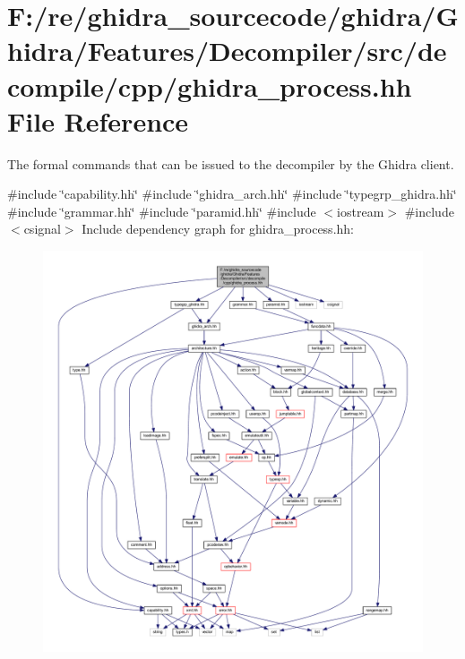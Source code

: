 \hypertarget{ghidra__process_8hh}{}\section{F\+:/re/ghidra\+\_\+sourcecode/ghidra/\+Ghidra/\+Features/\+Decompiler/src/decompile/cpp/ghidra\+\_\+process.hh File Reference}
\label{ghidra__process_8hh}


The formal commands that can be issued to the decompiler by the Ghidra client.  


{\ttfamily \#include \char`\"{}capability.\+hh\char`\"{}}\newline
{\ttfamily \#include \char`\"{}ghidra\+\_\+arch.\+hh\char`\"{}}\newline
{\ttfamily \#include \char`\"{}typegrp\+\_\+ghidra.\+hh\char`\"{}}\newline
{\ttfamily \#include \char`\"{}grammar.\+hh\char`\"{}}\newline
{\ttfamily \#include \char`\"{}paramid.\+hh\char`\"{}}\newline
{\ttfamily \#include $<$iostream$>$}\newline
{\ttfamily \#include $<$csignal$>$}\newline
Include dependency graph for ghidra\+\_\+process.\+hh\+:
\nopagebreak
\begin{figure}[H]
\begin{center}
\leavevmode
\includegraphics[width=350pt]{ghidra__process_8hh__incl}
\end{center}
\end{figure}
